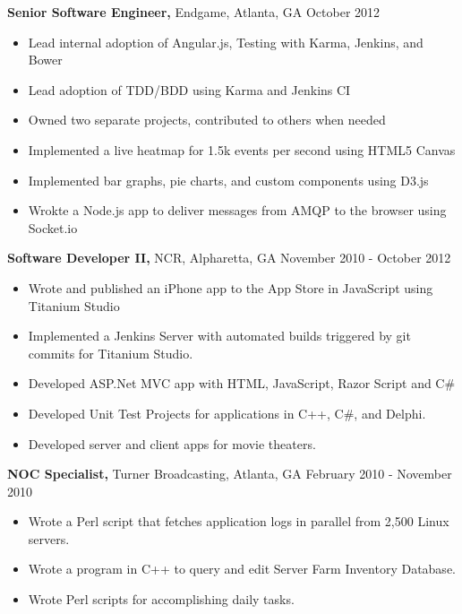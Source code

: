 \documentclass[margin]{res}
\begin{document}
\begin{resume}
    {\bf Senior Software Engineer,} Endgame, Atlanta, GA \hfill October 2012
        \begin{itemize} \itemsep -2pt %
            \item Lead internal adoption of Angular.js, Testing with Karma,
                Jenkins, and Bower
            \item Lead adoption of TDD/BDD using Karma and Jenkins CI
            \item Owned two separate projects, contributed to others when
                needed
            \item Implemented a live heatmap for 1.5k events per second using HTML5 Canvas
            \item Implemented bar graphs, pie charts, and custom components using D3.js
            \item Wrokte a Node.js app to deliver messages from AMQP to the browser using
                Socket.io
        \end{itemize}

    {\bf Software Developer II,} NCR, Alpharetta, GA \hfill November 2010 - October
    2012
        \begin{itemize} \itemsep -2pt
            \item Wrote and published an iPhone app to the App Store in JavaScript
                using Titanium Studio
            \item Implemented a Jenkins Server with automated builds triggered by
                git commits for Titanium Studio.
            \item Developed ASP.Net MVC app with HTML, JavaScript, Razor Script and
                C\#
            \item Developed Unit Test Projects for applications in C++, C\#, and
                Delphi.
            \item Developed server and client apps for movie theaters.
        \end{itemize}

    {\bf NOC Specialist,} Turner Broadcasting, Atlanta, GA \hfill February 2010 -
    November 2010
        \begin{itemize} \itemsep -2pt
            \item Wrote a Perl script that fetches application logs in parallel
                from 2,500 Linux servers.
            \item Wrote a program in C++ to query and edit Server Farm Inventory
                Database.
            \item Wrote Perl scripts for accomplishing daily tasks.
        \end{itemize}


\end{resume}
\end{document}
